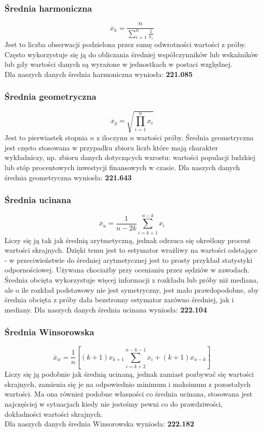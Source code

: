 \documentclass{article}
\theoremstyle{break}
\begin{document}
	\subsubsection*{Średnia harmoniczna}
	$$\overline{x}_h=\frac{n}{\sum\limits_{i=1}^{n}\frac{1}{x_i}}$$
	Jest to liczba obserwacji podzielona przez sumę odwrotności wartości z próby. Często wykorzystuje się ją do obliczania średniej współczynników lub wskaźników lub gdy wartości danych są wyrażone w jednostkach w postaci względnej. \\
	Dla naszych danych średnia harmoniczna wyniosła: \textbf{221.085}
	\subsubsection*{Średnia geometryczna}
	$$\overline{x}_g=\sqrt{\prod\limits_{i=1}^{n}x_i}$$
	Jest to pierwiastek stopnia $n$ z iloczynu $n$ wartości próby. Średnia geometryczna jest często stosowana w przypadku zbioru liczb które mają charakter wykładniczy, np. zbioru danych dotyczących wzrostu: wartości populacji ludzkiej lub stóp procentowych inwestycji finansowych w czasie.
	Dla naszych danych średnia geometryczna wyniosła: \textbf{221.643}
	\subsubsection*{Średnia ucinana}
	$$\overline{x}_u=\frac{1}{n-2k}\sum\limits_{i=k+1}^{n-k}x_i$$
	Liczy się ją tak jak średnią arytmetyczną, jednak odrzuca się określony procent wartości skrajnych. Dzięki temu jest to estymator wrażliwy na wartości odstające - w przeciwieństwie do średniej arytmetycznej jest to prosty przykład statystyki odpornościowej. Używana chociażby przy ocenianiu przez sędziów w zawodach. Średnia obcięta wykorzystuje więcej informacji z rozkładu lub próby niż mediana, ale o ile rozkład podstawowy nie jest symetryczny, jest mało prawdopodobne, aby średnia obcięta z próby dała bezstronny estymator zarówno średniej, jak i mediany.
	Dla naszych danych średnia ucinana wyniosła: \textbf{222.104}
	\subsubsection*{Średnia Winsorowska}
	$$\overline{x}_w=\frac{1}{n}[(k+1)x_{k+1}\sum\limits_{i=k+2}^{n-k-1}x_i +(k+1)x_{n-k}]$$
	Liczy się ją podobnie jak średnią ucinaną, jednak zamiast pozbywać się wartości skrajnych, zamienia się je na odpowiednio minimum i maksimum z pozostałych wartości. Ma ona również podobne własności co średnia ucinana, stosowana jest najczęściej w sytuacjach kiedy nie jesteśmy pewni co do prawdziwości, dokładności wartości skrajnych.
	\\Dla naszych danych średnia Winsorowska wyniosła: \textbf{222.182}
\end{document}
